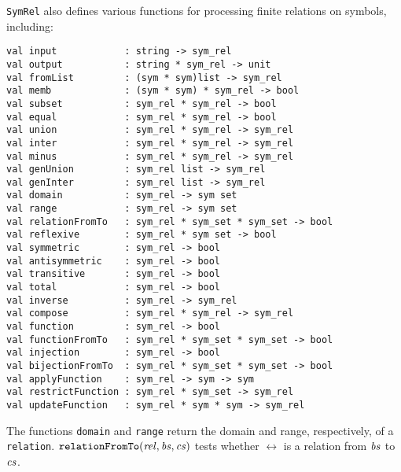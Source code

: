 \texttt{SymRel} also defines various functions for processing finite relations
on symbols, including:
\begin{verbatim}
val input            : string -> sym_rel
val output           : string * sym_rel -> unit
val fromList         : (sym * sym)list -> sym_rel
val memb             : (sym * sym) * sym_rel -> bool
val subset           : sym_rel * sym_rel -> bool
val equal            : sym_rel * sym_rel -> bool
val union            : sym_rel * sym_rel -> sym_rel
val inter            : sym_rel * sym_rel -> sym_rel
val minus            : sym_rel * sym_rel -> sym_rel
val genUnion         : sym_rel list -> sym_rel
val genInter         : sym_rel list -> sym_rel
val domain           : sym_rel -> sym set
val range            : sym_rel -> sym set
val relationFromTo   : sym_rel * sym_set * sym_set -> bool
val reflexive        : sym_rel * sym set -> bool
val symmetric        : sym_rel -> bool
val antisymmetric    : sym_rel -> bool
val transitive       : sym_rel -> bool
val total            : sym_rel -> bool
val inverse          : sym_rel -> sym_rel
val compose          : sym_rel * sym_rel -> sym_rel
val function         : sym_rel -> bool
val functionFromTo   : sym_rel * sym_set * sym_set -> bool
val injection        : sym_rel -> bool
val bijectionFromTo  : sym_rel * sym_set * sym_set -> bool
val applyFunction    : sym_rel -> sym -> sym
val restrictFunction : sym_rel * sym_set -> sym_rel
val updateFunction   : sym_rel * sym * sym -> sym_rel
\end{verbatim}
%
%
%
%
%
%
%
%
%
%
%
%
%
%
%
%
%
%
%
%
%
%
%
%
%
%
The functions \texttt{domain} and \texttt{range} return the domain
and range, respectively, of a \texttt{relation}.
$\mathtt{relationFromTo}(\mathit{rel}, \mathit{bs}, \mathit{cs})$ tests whether $\rel$
is a relation from $\mathit{bs}$ to $\mathit{cs}$.

